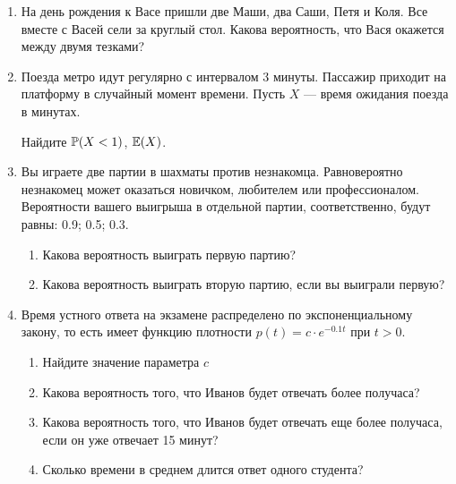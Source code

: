 \begin{enumerate}
\item На день рождения к Васе пришли две Маши, два Саши, Петя и Коля. Все вместе с Васей сели за круглый стол. Какова вероятность, что Вася окажется между двумя тезками?

\item Поезда метро идут регулярно с интервалом 3 минуты. Пассажир
приходит на платформу в случайный момент времени. Пусть $X$ —
время ожидания поезда в минутах.

Найдите $\P(X<1)$, $\E(X)$.


\item Вы играете две партии в шахматы против незнакомца. Равновероятно
незнакомец может оказаться новичком, любителем или профессионалом.
Вероятности вашего выигрыша в отдельной партии, соответственно,
будут равны: 0.9; 0.5; 0.3.
\begin{enumerate}
\item Какова вероятность выиграть первую партию?
\item Какова вероятность выиграть вторую партию, если вы выиграли
первую?
\end{enumerate}

\item Время устного ответа на экзамене распределено по экспоненциальному закону, то есть имеет функцию плотности $p(t)=c\cdot e^{-0.1t}$ при $t>0$.
\begin{enumerate}
\item Найдите значение параметра $c$
\item Какова вероятность того, что Иванов будет отвечать более получаса?
\item Какова вероятность того, что Иванов будет отвечать еще более получаса, если он уже отвечает 15 минут?
\item Сколько времени в среднем длится ответ одного студента?
\end{enumerate}





\end{enumerate}
